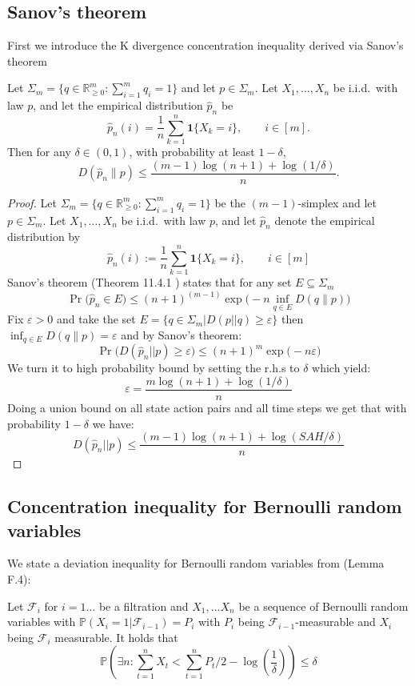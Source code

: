 \documentclass[final,12pt]{colt2026} %
\begin{document}
\subsection{Sanov's theorem}\label{Sanov}
First we introduce the K divergence concentration inequality derived via Sanov's theorem
\begin{lemma}
Let $\Sigma_m = \{q\in\mathbb{R}^m_{\ge 0}:\sum_{i=1}^m q_i=1\}$ and let $p\in\Sigma_m$.
Let $X_1,\dots,X_n$ be i.i.d.\ with law $p$, and let the empirical distribution $\widehat{p}_n$ be
\[
\widehat{p}_n(i)=\frac{1}{n}\sum_{k=1}^n \mathbf{1}\{X_k=i\},\qquad i\in[m].
\]
Then for any $\delta\in(0,1)$, with probability at least $1-\delta$,
\[
D(\widehat{p}_n\|p)\leq\frac{(m-1)\log(n+1)+\log(1/\delta)}{n}.
\]
\end{lemma}
\begin{proof}
Let $\Sigma_m = \Big\{ q \in \mathbb{R}^m_{\ge 0} : \sum_{i=1}^m q_i = 1 \Big\}$ be the $(m-1)$-simplex and let $p \in \Sigma_m$. 
Let $X_1,\ldots,X_n$ be i.i.d.\ with law $p$, and let $\widehat{p}_n$ denote the empirical distribution by
$$
\widehat{p}_n(i) := \frac{1}{n}\sum_{k=1}^n \mathbf{1}\{X_k=i\}, \qquad i\in[m]
$$
Sanov's theorem (Theorem 11.4.1 \cite{CoverThomas2006}) states that for any set $E \subseteq \Sigma_m$ 
$$
\Pr \big(\widehat{p}_n \in E\big)\leq(n+1)^{(m-1)}\exp\Big(-n\inf_{q\in E} D(q\|p)\Big)
$$
Fix $\varepsilon > 0 $ and take the set $E = \{ q \in \Sigma_m| D(p||q) \geq \varepsilon\}$ then $\inf_{q\in E} D(q\|p) = \varepsilon$ and by Sanov's theorem: 
$$
\Pr \big(D(\widehat{p}_n||p) \geq \varepsilon\big) \leq (n+1)^m\exp\Big(-n\varepsilon\Big)
$$
We turn it to high probability bound by setting the r.h.s to $\delta$ which yield:
$$\varepsilon = \frac{m \log(n+1) + \log(1/\delta)}{n}$$
Doing a union bound on all state action pairs and all time steps we get that with probability $1 - \delta$ we have:
$$
D(\widehat{p}_n||p) \leq \frac{(m-1) \log(n+1) + \log(SAH/\delta)}{n} 
$$
\end{proof}
\subsection{Concentration inequality for Bernoulli random variables}
    We state a deviation inequality for Bernoulli random variables from \cite{DannLB17}(Lemma F.4):
\begin{lemma}\label{Bernoulli}
Let $\mathcal{F}_i$ for $i = 1 \dots$ be a filtration and $X_1, \dots X_n$ be a sequence of Bernoulli random variables with $\mathbb{P}(X_i = 1|\mathcal{F}_{i-1}) = P_i$ with $P_i$ being $\mathcal{F}_{i-1}$-measurable and $X_i$ being $\mathcal{F}_i$ measurable. It holds that
$$
\mathbb{P} \left( \exists n : \sum_{t=1}^{n} X_t < \sum_{t=1}^{n} P_t/2 - \log(\frac{1}{\delta}) \right) \leq \delta
$$
\end{lemma}
\end{document}
